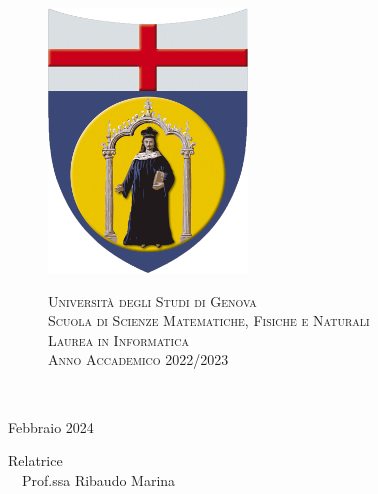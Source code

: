 \hypersetup{pageanchor=false}
\thispagestyle{empty}
\begin{figure}[h!]
 \centering
 \includegraphics[scale=.20]{Images/Logo_Unige.png} %
	\begin{center} 
		\Large
		{\textsc{Università degli Studi di Genova}}\\
		  \vspace{1em}
		  \large
	         \textsc{Scuola di Scienze Matematiche, Fisiche e Naturali}\\
            \vspace{1em}
		    \large
	         \textsc{Laurea in Informatica}\\
            \vspace{1em}
		  \large
	         \textsc{Anno Accademico 2022/2023}\\

	\end{center}
\end{figure}



\begin{center} 
	
	\vspace{2em}


		\LARGE
		\textbf{\Title} \\
\end{center}
    \begin{center}
	   \vspace{1cm}	
		\normalsize
		Febbraio 2024\\ 
	\end{center}
	\vspace{15em}

\vfill


	 \hfill  {Relatrice}	
	\\
	\ \hfill\ {Prof.ssa Ribaudo Marina}
\newline
\vspace{2em}
\vfill
